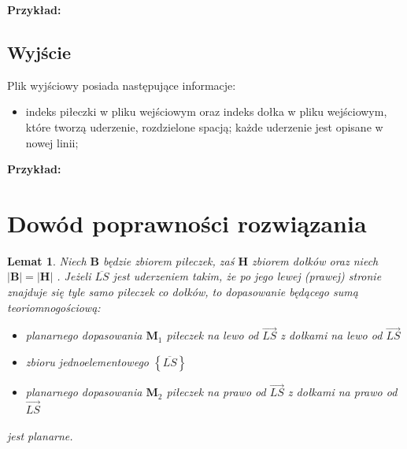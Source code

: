 \documentclass[10pt,a4paper]{article}
\newtheorem{lemma}{Lemat}
\begin{document}
	\textbf{Przykład:} 
	
	\subsection{Wyjście}
	
	Plik wyjściowy posiada następujące informacje:
	\begin{itemize}
		\item indeks piłeczki w pliku wejściowym oraz indeks dołka w pliku wejściowym, które tworzą uderzenie, rozdzielone spacją; każde uderzenie jest opisane w nowej linii;
	\end{itemize}
	
	\textbf{Przykład:} 
	
	\pagebreak
	
	\section{Dowód poprawności rozwiązania}
	
	\begin{lemma}\label{lemma:1}
		Niech $\mathbf{B}$ będzie zbiorem piłeczek, zaś $\mathbf{H}$ zbiorem dołków oraz niech $|\mathbf{B}| = |\mathbf{H}|$ . Jeżeli $\overline{LS}$ jest uderzeniem takim, że po jego lewej (prawej) stronie znajduje się tyle samo piłeczek co dołków, to dopasowanie będącego sumą teoriomnogościową:
		\begin{itemize}
			\item planarnego dopasowania $\mathbf{M}_{1}$ piłeczek na lewo od $\overrightarrow{LS}$ z dołkami na lewo od $\overrightarrow{LS}$
			\item zbioru jednoelementowego $\left\{\overline{LS}\right\}$
			\item planarnego dopasowania $\mathbf{M}_{2}$ piłeczek na prawo od $\overrightarrow{LS}$ z dołkami na prawo od $\overrightarrow{LS}$
		\end{itemize}
		jest planarne.
	\end{lemma}
\end{document}

